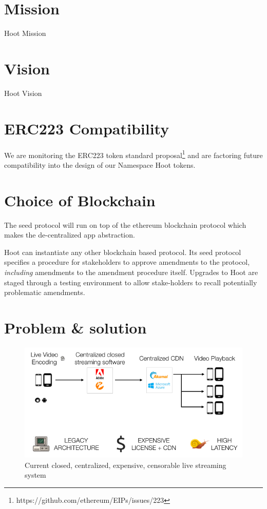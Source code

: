 \documentclass{article}
\begin{document}
\section{Mission}
Hoot Mission

\section{Vision}
Hoot Vision

\section{ERC223 Compatibility}
We are monitoring the ERC223 token standard proposal\footnote{https://github.com/ethereum/EIPs/issues/223} and are factoring future compatibility into the design of our Namespace Hoot tokens.

\section{Choice of Blockchain}
The seed protocol will run on top of the ethereum blockchain protocol which makes the de-centralized app abstraction. 


Hoot can instantiate any other blockchain based protocol. Its seed protocol specifies a procedure for stakeholders to approve amendments to the protocol,
\emph{including} amendments to the amendment procedure itself.
Upgrades to Hoot are staged through a testing environment to allow stake-holders to recall potentially problematic amendments.


\section{Problem \& solution}


\begin{figure}[h!]
  \centering
  \includegraphics[width=1.0\textwidth]{problem-architecture}
  \caption{Current closed, centralized, expensive, censorable live streaming system}
  \label{image:problem-architecture}
\end{figure}
\end{document}
